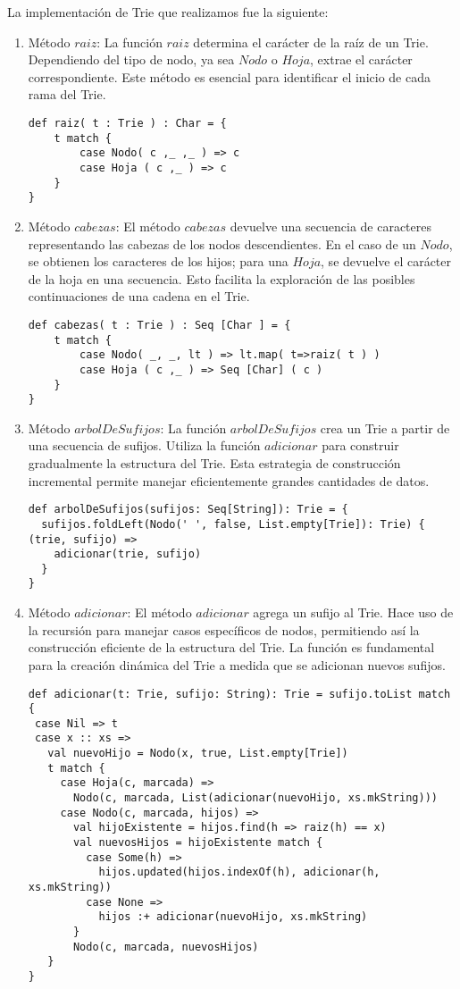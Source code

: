 \documentclass[conference]{IEEEtran}
\begin{document}
La implementación de Trie que realizamos fue la siguiente:
\begin{enumerate}
    \item Método $raiz$:
    La función $raiz$ determina el carácter de la raíz de un Trie. Dependiendo del tipo de nodo, ya sea $Nodo$ o $Hoja$, extrae el carácter correspondiente. Este método es esencial para identificar el inicio de cada rama del Trie.
    \begin{lstlisting}
def raiz( t : Trie ) : Char = {
    t match {
        case Nodo( c ,_ ,_ ) => c
        case Hoja ( c ,_ ) => c
    }
} 
    \end{lstlisting}


    \item Método $cabezas$:
    El método $cabezas$ devuelve una secuencia de caracteres representando las cabezas de los nodos descendientes. En el caso de un $Nodo$, se obtienen los caracteres de los hijos; para una $Hoja$, se devuelve el carácter de la hoja en una secuencia. Esto facilita la exploración de las posibles continuaciones de una cadena en el Trie.
\begin{lstlisting}
def cabezas( t : Trie ) : Seq [Char ] = {
    t match {
        case Nodo( _, _, lt ) => lt.map( t=>raiz( t ) )
        case Hoja ( c ,_ ) => Seq [Char] ( c )
    }
}

\end{lstlisting}
\newpage
    \item Método $arbolDeSufijos$:
    La función $arbolDeSufijos$ crea un Trie a partir de una secuencia de sufijos. Utiliza la función $adicionar$ para construir gradualmente la estructura del Trie. Esta estrategia de construcción incremental permite manejar eficientemente grandes cantidades de datos.

    \begin{lstlisting}
def arbolDeSufijos(sufijos: Seq[String]): Trie = {
  sufijos.foldLeft(Nodo(' ', false, List.empty[Trie]): Trie) { (trie, sufijo) =>
    adicionar(trie, sufijo)
  }
}

\end{lstlisting}

    \item Método $adicionar$:
    El método $adicionar$ agrega un sufijo al Trie. Hace uso de la recursión para manejar casos específicos de nodos, permitiendo así la construcción eficiente de la estructura del Trie. La función es fundamental para la creación dinámica del Trie a medida que se adicionan nuevos sufijos.

\begin{lstlisting}
def adicionar(t: Trie, sufijo: String): Trie = sufijo.toList match {
 case Nil => t
 case x :: xs =>
   val nuevoHijo = Nodo(x, true, List.empty[Trie])
   t match {
     case Hoja(c, marcada) =>
       Nodo(c, marcada, List(adicionar(nuevoHijo, xs.mkString)))
     case Nodo(c, marcada, hijos) =>
       val hijoExistente = hijos.find(h => raiz(h) == x)
       val nuevosHijos = hijoExistente match {
         case Some(h) =>
           hijos.updated(hijos.indexOf(h), adicionar(h, xs.mkString))
         case None =>
           hijos :+ adicionar(nuevoHijo, xs.mkString)
       }
       Nodo(c, marcada, nuevosHijos)
   }
}


\end{lstlisting}
\end{enumerate}
\end{document}
